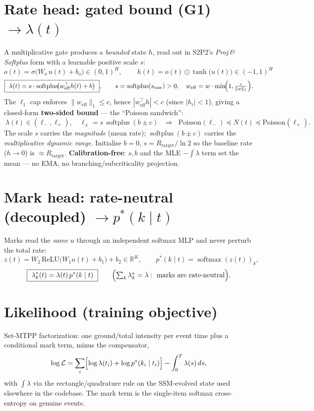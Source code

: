 \documentclass[11pt]{article}
\newcommand{\R}{\mathbb{R}}
\newcommand{\softplus}{\operatorname{softplus}}
\newcommand{\softmax}{\operatorname{softmax}}
\begin{document}
\section{Rate head: gated bound (G1) $\to\lambda(t)$}
A multiplicative gate produces a \emph{bounded} state $h$, read out in S2P2's
\emph{Proj\,\&\,Softplus} form with a learnable positive scale $s$:
\[
o(t)=\sigma\!\bigl(W_o\,u(t)+b_o\bigr)\in(0,1)^{H},\qquad
\boxed{\,h(t)=o(t)\odot\tanh\!\bigl(u(t)\bigr)\in(-1,1)^{H}\,}
\]
\[
\boxed{\ \lambda(t)=s\cdot\softplus\!\bigl(w_{\mathrm{eff}}^{\top} h(t)+b\bigr)\ },\qquad
s=\softplus(s_{\mathrm{raw}})>0,\quad
w_{\mathrm{eff}}=w\cdot\min\!\Bigl(1,\tfrac{c}{\lVert w\rVert_1}\Bigr).
\]
The $\ell_1$ cap enforces $\lVert w_{\mathrm{eff}}\rVert_1\le c$, hence $|w_{\mathrm{eff}}^\top h|<c$
(since $|h_i|<1$), giving a closed-form \textbf{two-sided bound} — the ``Poisson sandwich'':
\[
\boxed{\ \lambda(t)\in(\ell_-,\ell_+),\quad
\ell_\pm=s\,\softplus(b\pm c)\ }
\;\;\Longrightarrow\;\;
\mathrm{Poisson}(\ell_-)\preceq N(t)\preceq\mathrm{Poisson}(\ell_+).
\]
The scale $s$ carries the \emph{magnitude} (mean rate); $\softplus(b\pm c)$ carries the
\emph{multiplicative dynamic range}. Initialise $b{=}0$, $s{=}R_{\mathrm{target}}/\ln 2$ so the
baseline rate ($h{\to}0$) is $\approx R_{\mathrm{target}}$. \textbf{Calibration-free}: $s,b$ and the
MLE $-\!\int\lambda$ term set the mean — no EMA, no branching/subcriticality projection.

\section{Mark head: rate-neutral (decoupled) $\to p^*(k\mid t)$}
Marks read the \emph{same} $u$ through an independent softmax MLP and never perturb the total rate:
\[
z(t)=W_2\,\mathrm{ReLU}\!\bigl(W_1 u(t)+b_1\bigr)+b_2\in\R^{K},\qquad
p^*(k\mid t)=\softmax(z(t))_k,
\]
\[
\boxed{\ \lambda^*_k(t)=\lambda(t)\,p^*(k\mid t)\ }\qquad
\Bigl(\textstyle\sum_k\lambda^*_k=\lambda:\ \text{marks are rate-neutral}\Bigr).
\]

\section{Likelihood (training objective)}
Set-MTPP factorization: one ground/total intensity per event time plus a conditional mark term,
minus the compensator,
\[
\log\mathcal L=\sum_{i}\Bigl[\log\lambda(t_i)+\log p^*(k_i\mid t_i)\Bigr]-\int_0^T\lambda(s)\,ds ,
\]
with $\int\lambda$ via the rectangle/quadrature rule on the SSM-evolved state used elsewhere in the
codebase. The mark term is the single-item softmax cross-entropy on genuine events.
\end{document}
